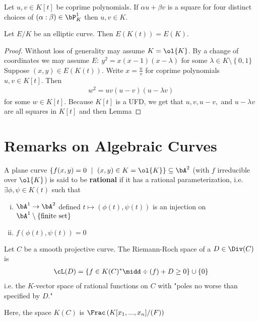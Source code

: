 \begin{lem}\label{lem:fermat-uni-descent-polynomials}
	Let $u, v \in K[t]$ be coprime polynomials. If $\alpha u + \beta v$ is a square for four distinct choices of $(\alpha:\beta) \in \bP^1_K$ then $u,v \in K$. 
\end{lem}

\bigskip

\begin{cor}[1.6 in Lecture]\label{cor:points-on-E-same-for-K-and-functions-on-K}
	Let $E/K$ be an elliptic curve. Then $E(K(t)) = E(K)$.
\end{cor}
\begin{proof}
	Without loss of generality may assume $K = \ol{K}$. By a change of coordinates we may assume $E: ~ y^{2}=x(x-1)(x-\lambda)$ for some $\lambda \in K\setminus \left\{0,1\}\right.$ Suppose $(x,y) \in E(K(t))$. Write $x = \frac{u}{v}$ for coprime polynomials $u,v \in K[t]$. Then
	 \begin{align*}
		w^{2} = uv(u - v)(u - \lambda v)
	\end{align*}
	for some $w \in K[t]$. Because $K[t]$ is a UFD, we get that $u,v,u-v,$ and $u - \lambda v$ are all squares in $K[t]$ and then Lemma
\end{proof}

\bigskip
\section{Remarks on Algebraic Curves}
\begin{defn}\label{defn:plane-curve-rational}
	A plane curve $\{f(x,y) = 0 ~\mid~ (x,y) \in K = \ol{K}\} \subseteq \bA^2$ (with $f$ irreducible over $\ol{K}$) is said to be \textbf{rational} if it has a rational parameterization, i.e. $\exists \phi, \psi \in K(t)$ such that

	\begin{enumerate}[(i)]
		\item $\bA^1\to \bA^2$ defined $t \mapsto (\phi(t), \psi(t))$ is an injection on $\bA^1\setminus \{\text{finite set}\}$
		\item $f(\phi(t),\psi(t)) = 0$
	\end{enumerate}
\end{defn}
\begin{defn}\label{defn:reim-roch-space}
	Let $C$ be a smooth projective curve. The Riemann-Roch space of a $D \in \Div(C)$ is
	\begin{align*}
		\cL(D) = \left\{f \in K(C)^* \midd \div(f) + D \geq 0\right\} \cup \left\{0\right\}
	\end{align*}
	i.e. the $K$-vector space of rational functions on $C$ with "poles no worse than specified by $D$."
\end{defn}
Here, the space $K(C)$ is $\Frac\left(K[x_1,...,x_n]/(F)\right)$

